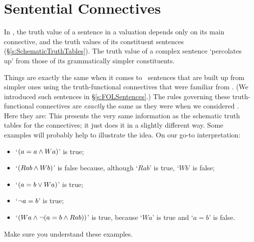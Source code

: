 \section{Sentential Connectives}\label{fol.truth.sent}

 In \TFL, the truth value of a sentence in a valuation depends only on its main connective, and the truth values of its constituent sentences (§\ref{s:SchematicTruthTables}). The truth value of a complex sentence ‘percolates up’ from those of its grammatically simpler constituents.

Things are exactly the same when it comes to \FOL\ sentences that are built up from simpler ones using the truth-functional connectives that were familiar from \TFL. (We introduced such sentences in §\ref{s:FOLSentences}.) The rules governing these truth-functional connectives are \emph{exactly} the same as they were when we considered \TFL. Here they are:
This presents the very same information as the schematic truth tables for the connectives; it just does it in a slightly different way. Some examples will probably help to illustrate the idea. On our go-to interpretation:
	\begin{itemize}
		\item `$(a = a \wedge Wa)$' is true;
		\item `$(Rab \wedge Wb)$' is false because, although `$Rab$' is true, `$Wb$' is false;
		\item `$(a = b \vee Wa)$' is true;
		\item `$\neg a = b$' is true;
		\item `$(Wa \wedge \neg( a= b \wedge Rab))$' is true, because `$Wa$' is true and `$a = b$' is false.
	\end{itemize}
Make sure you understand these examples.

